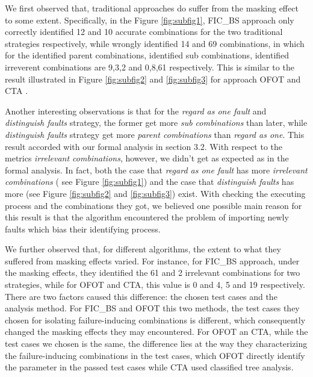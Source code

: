 \documentclass{sig-alternate}
\begin{document}
We first observed that, traditional approaches do suffer from the masking effect to some extent. Specifically, in the Figure \ref{fig:subfig1}, FIC\_BS approach only correctly identified 12 and 10 accurate combinations for the two traditional strategies respectively, while wrongly identified 14 and 69 combinations, in which for the identified parent combinations, identified sub combinations, identified irreverent combinations are 9,3,2 and 0,8,61 respectively. This is similar to the result illustrated in Figure \ref{fig:subfig2} and \ref{fig:subfig3} for approach OFOT and CTA .

Another interesting observations is that for the \emph{regard as one fault} and \emph{distinguish faults} strategy, the former get more \emph{sub combinations} than later, while \emph{distinguish faults} strategy get more \emph{parent combinations} than \emph{regard as one}. This result accorded with our formal analysis in section 3.2. With respect to the metrics \emph{irrelevant combinations}, however, we didn't get as expected as in the formal analysis. In fact, both the case that \emph{regard as one fault} has more \emph{irrelevant combinations} ( see Figure \ref{fig:subfig1}) and the case that \emph{distinguish faults} has more (see Figure \ref{fig:subfig2} and \ref{fig:subfig3}) exist. With checking the executing process and the combinations they got, we believed one possible main reason for this result is that the algorithm encountered the problem of importing newly faults which bias their identifying process.


We further observed that, for different algorithms, the extent to what they suffered from masking effects varied. For instance, for FIC\_BS approach, under the masking effects, they  identified the 61 and 2 irrelevant combinations for two strategies, while for OFOT and CTA, this value is 0 and 4, 5 and 19 respectively. There are two factors caused this difference: the chosen test cases and the analysis method. For FIC\_BS and OFOT this two methods, the test cases they chosen for isolating failure-inducing combinations is different, which consequently changed the masking effects they may encountered. For OFOT an CTA, while the test cases we chosen is the same, the difference lies at the way they characterizing the failure-inducing combinations in the test cases, which OFOT directly identify the parameter in the passed test cases while CTA used classified tree analysis.
\end{document}
